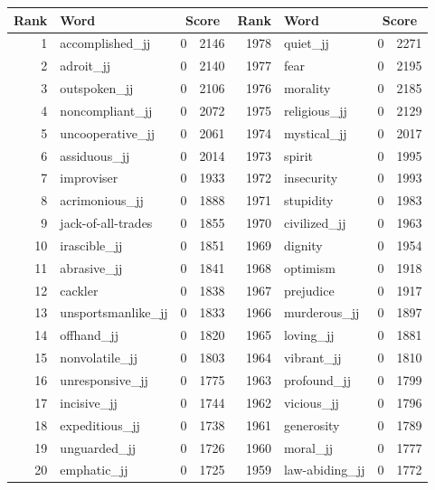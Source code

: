 \begin{table}[tbp]
    \begin{tabular}{| rlr@{.}l | rlr@{.}l |}
    \hline
    \textbf{Rank} & \textbf{Word} & \multicolumn{2}{c|}{\textbf{Score}} & \textbf{Rank} & \textbf{Word} & \multicolumn{2}{c|}{\textbf{Score}} \\
    \hline
    1 & accomplished\_jj & 0 & 2146    &    1978 & quiet\_jj & 0 & 2271 \\
    2 & adroit\_jj & 0 & 2140    &    1977 & fear & 0 & 2195 \\
    3 & outspoken\_jj & 0 & 2106    &    1976 & morality & 0 & 2185 \\
    4 & noncompliant\_jj & 0 & 2072    &    1975 & religious\_jj & 0 & 2129 \\
    5 & uncooperative\_jj & 0 & 2061    &    1974 & mystical\_jj & 0 & 2017 \\
    6 & assiduous\_jj & 0 & 2014    &    1973 & spirit & 0 & 1995 \\
    7 & improviser & 0 & 1933    &    1972 & insecurity & 0 & 1993 \\
    8 & acrimonious\_jj & 0 & 1888    &    1971 & stupidity & 0 & 1983 \\
    9 & jack-of-all-trades & 0 & 1855    &    1970 & civilized\_jj & 0 & 1963 \\
    10 & irascible\_jj & 0 & 1851    &    1969 & dignity & 0 & 1954 \\
    11 & abrasive\_jj & 0 & 1841    &    1968 & optimism & 0 & 1918 \\
    12 & cackler & 0 & 1838    &    1967 & prejudice & 0 & 1917 \\
    13 & unsportsmanlike\_jj & 0 & 1833    &    1966 & murderous\_jj & 0 & 1897 \\
    14 & offhand\_jj & 0 & 1820    &    1965 & loving\_jj & 0 & 1881 \\
    15 & nonvolatile\_jj & 0 & 1803    &    1964 & vibrant\_jj & 0 & 1810 \\
    16 & unresponsive\_jj & 0 & 1775    &    1963 & profound\_jj & 0 & 1799 \\
    17 & incisive\_jj & 0 & 1744    &    1962 & vicious\_jj & 0 & 1796 \\
    18 & expeditious\_jj & 0 & 1738    &    1961 & generosity & 0 & 1789 \\
    19 & unguarded\_jj & 0 & 1726    &    1960 & moral\_jj & 0 & 1777 \\
    20 & emphatic\_jj & 0 & 1725    &    1959 & law-abiding\_jj & 0 & 1772 \\

\end{tabular}
\end{table}
